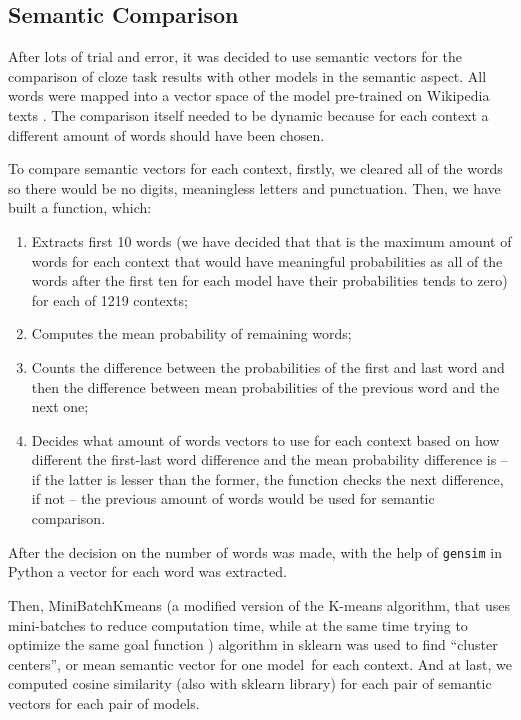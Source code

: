 \documentclass[a4paper]{article}
\begin{document}
\subsection{Semantic Comparison}

After lots of trial and error, it was decided to use semantic vectors for the comparison of cloze task results with other models in the semantic aspect. All words were mapped into a vector space of the model pre-trained on Wikipedia texts \cite{arefyev}. The comparison itself needed to be dynamic because for each context a different amount of words should have been chosen.

To compare semantic vectors for each context, firstly, we cleared all of the words so there would be no digits, meaningless letters and punctuation. Then, we have built a function, which:

\begin{enumerate}[1)]
\item Extracts first 10 words (we have decided that that is the maximum amount of words for each context that would have meaningful probabilities as all of the words after the first ten for each model have their probabilities tends to zero) for each of 1219 contexts;
\item Computes the mean probability of remaining words; 
\item Counts the difference between the probabilities of the first and last word and then the difference between mean probabilities of the previous word and the next one;
\item Decides what amount of words vectors to use for each context based on how different the first-last word difference and the mean probability difference is – if the latter is lesser than the former, the function checks the next difference, if not – the previous amount of words would be used for semantic comparison.
\end{enumerate}

After the decision on the number of words was made, with the help of \texttt{gensim} in Python a vector for each word was extracted.

Then, MiniBatchKmeans (a modified version of the K-means algorithm, that uses mini-batches to reduce computation time, while at the same time trying to optimize the same goal function \cite{bejar}) algorithm in sklearn was used to find “cluster centers”, or mean semantic vector for one model for each context. And at last, we computed cosine similarity (also with sklearn library) for each pair of semantic vectors for each pair of models.
\end{document}
